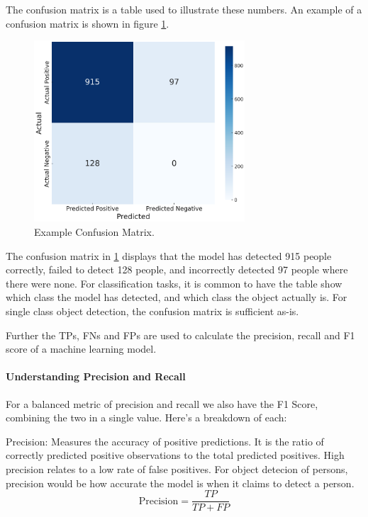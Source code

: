 The confusion matrix is a table used to illustrate these numbers. An example of a confusion matrix is shown in figure \ref{fig:confusion_matrix}. 

\begin{figure}[H]
    \centering
    \includegraphics[width=0.7\textwidth]{Images/Diagrams/confusion_matrix.png}
    \caption{Example Confusion Matrix.}
    \label{fig:confusion_matrix}
\end{figure}

The confusion matrix in \ref{fig:confusion_matrix} displays that the model has detected 915 people correctly, failed to detect 128 people, and incorrectly detected 97 people where there were none. For classification tasks, it is common to have the table show which class the model has detected, and which class the object actually is. For single class object detection, the confusion matrix is sufficient as-is.

Further the TPs, FNs and FPs are used to calculate the precision, recall and F1 score of a machine learning model.

\paragraph{Understanding Precision and Recall}
\label{sec:understandingprecision}
For a balanced metric of precision and recall we also have the F1 Score, combining the two in a single value. Here’s a breakdown of each:

Precision: Measures the accuracy of positive predictions. It is the ratio of correctly predicted positive observations to the total predicted positives. High precision relates to a low rate of false positives. For object detecion of persons, precision would be how accurate the model is when it claims to detect a person.
\begin{equation}
    \text{Precision} = \frac{TP}{TP + FP}	
\end{equation}


